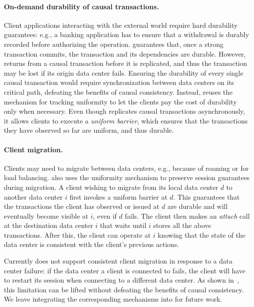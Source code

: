 \paragraph{On-demand durability of causal transactions.} Client applications
interacting with the external world require hard durability guarantees:
e.g., a banking application has to ensure that a withdrawal is durably recorded
before authorizing the operation. \System guarantees that, once a strong
transaction commits, the transaction and its dependencies are durable. However,
\System returns from a causal transaction before it is replicated, and thus the
transaction may be lost if its origin data center fails. Ensuring the durability
of every single causal transaction would require synchronization between data
centers on its critical path, defeating the benefits of causal consistency.
Instead, \System reuses the mechanism for tracking uniformity to let the clients
pay the cost of durability only when necessary. Even though \System replicates
causal transactions asynchronously, it allows clients to execute a \emph{uniform
  barrier}, which ensures that the transactions they have observed so far are
uniform, and thus durable.




\paragraph{Client migration.} Clients may need to migrate between
data centers, e.g., because of roaming or for load balancing. \System also uses
the uniformity mechanism to preserve session guarantees during migration.
A client wishing to migrate from its local data center $d$ to another data
center $i$ first invokes a uniform barrier at $d$. This guarantees that the
transactions the client has observed or issued at $d$ are durable and will
eventually become visible at $i$, even if $d$ fails. The client then makes an
{\em attach} call at the destination data center $i$ that waits until $i$ stores
all the above transactions. After this, the client can operate at $i$ knowing
that the state of the data center is consistent with the client's previous
actions. 

Currently \System does not support consistent client migration in response
to a data center failure: if the data center a client is connected to fails, the
client will have to restart its session when connecting to a different data
center. 
As shown in~\cite{swiftcloud}, this limitation can be lifted without defeating
the benefits of causal consistency. We leave integrating the corresponding
mechanisms into \System for future work.






